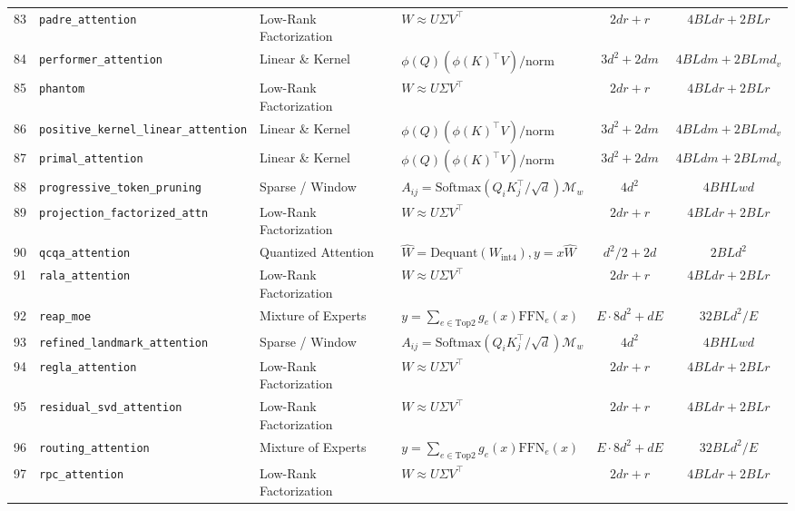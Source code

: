 \begin{center}
\begin{longtable}{rlllcc}
83 & \texttt{padre\_attention} & Low-Rank Factorization & $W \approx U \Sigma V^\top$ & $2 d r + r$ & $4 B L d r + 2 B L r$ \\
84 & \texttt{performer\_attention} & Linear \& Kernel & $\phi(Q)(\phi(K)^\top V) / \text{norm}$ & $3 d^2 + 2 d m$ & $4 B L d m + 2 B L m d_v$ \\
85 & \texttt{phantom} & Low-Rank Factorization & $W \approx U \Sigma V^\top$ & $2 d r + r$ & $4 B L d r + 2 B L r$ \\
86 & \texttt{positive\_kernel\_linear\_attention} & Linear \& Kernel & $\phi(Q)(\phi(K)^\top V) / \text{norm}$ & $3 d^2 + 2 d m$ & $4 B L d m + 2 B L m d_v$ \\
87 & \texttt{primal\_attention} & Linear \& Kernel & $\phi(Q)(\phi(K)^\top V) / \text{norm}$ & $3 d^2 + 2 d m$ & $4 B L d m + 2 B L m d_v$ \\
88 & \texttt{progressive\_token\_pruning} & Sparse / Window & $A_{ij} = \text{Softmax}(Q_i K_j^\top / \sqrt{d}) \mathcal{M}_w$ & $4 d^2$ & $4 B H L w d$ \\
89 & \texttt{projection\_factorized\_attn} & Low-Rank Factorization & $W \approx U \Sigma V^\top$ & $2 d r + r$ & $4 B L d r + 2 B L r$ \\
90 & \texttt{qcqa\_attention} & Quantized Attention & $\hat{W} = \text{Dequant}(W_{\text{int4}}), y = x \hat{W}$ & $d^2 / 2 + 2 d$ & $2 B L d^2$ \\
91 & \texttt{rala\_attention} & Low-Rank Factorization & $W \approx U \Sigma V^\top$ & $2 d r + r$ & $4 B L d r + 2 B L r$ \\
92 & \texttt{reap\_moe} & Mixture of Experts & $y = \sum_{e \in \text{Top2}} g_e(x) \text{FFN}_e(x)$ & $E \cdot 8 d^2 + d E$ & $32 B L d^2 / E$ \\
93 & \texttt{refined\_landmark\_attention} & Sparse / Window & $A_{ij} = \text{Softmax}(Q_i K_j^\top / \sqrt{d}) \mathcal{M}_w$ & $4 d^2$ & $4 B H L w d$ \\
94 & \texttt{regla\_attention} & Low-Rank Factorization & $W \approx U \Sigma V^\top$ & $2 d r + r$ & $4 B L d r + 2 B L r$ \\
95 & \texttt{residual\_svd\_attention} & Low-Rank Factorization & $W \approx U \Sigma V^\top$ & $2 d r + r$ & $4 B L d r + 2 B L r$ \\
96 & \texttt{routing\_attention} & Mixture of Experts & $y = \sum_{e \in \text{Top2}} g_e(x) \text{FFN}_e(x)$ & $E \cdot 8 d^2 + d E$ & $32 B L d^2 / E$ \\
97 & \texttt{rpc\_attention} & Low-Rank Factorization & $W \approx U \Sigma V^\top$ & $2 d r + r$ & $4 B L d r + 2 B L r$ \\

\end{longtable}
\end{center}
